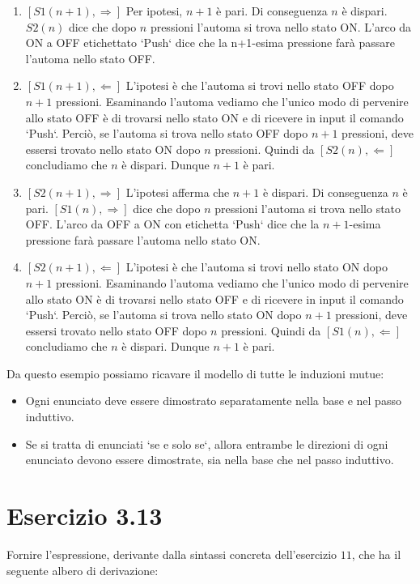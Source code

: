 		\begin{enumerate}
		  \item $[S1(n+1), \Rightarrow]$ Per ipotesi, $n+1$ è pari. Di conseguenza $n$ è
		  dispari.
		  $S2(n)$ dice che dopo $n$ pressioni l'automa si trova nello stato ON. L'arco
		  da ON a OFF etichettato `Push` dice che la n+1-esima pressione farà
		  passare l'automa nello stato OFF.
		  \item $[S1(n+1), \Leftarrow]$ L'ipotesi è che l'automa si trovi nello
		  stato OFF dopo $n+1$ pressioni. Esaminando l'automa vediamo che l'unico modo
		  di pervenire allo stato OFF è di trovarsi nello stato ON e di ricevere in
		  input il comando `Push`. Perciò, se l'automa si trova nello stato OFF dopo
		  $n+1$ pressioni, deve essersi trovato nello stato ON dopo $n$ pressioni.
		  Quindi da $[S2(n), \Leftarrow]$ concludiamo che $n$ è dispari. Dunque
		  $n+1$ è pari.
		  \item $[S2(n+1), \Rightarrow]$ L'ipotesi afferma che $n+1$ è dispari. Di conseguenza
		  $n$ è pari. $[S1(n), \Rightarrow]$ dice che dopo $n$ pressioni l'automa si trova
		  nello stato OFF. L'arco da OFF a ON con etichetta `Push` dice che la
		  $n+1$-esima pressione farà passare l'automa nello stato ON.
		  \item $[S2(n+1), \Leftarrow]$ L'ipotesi è che l'automa si trovi nello
		  stato ON dopo $n+1$ pressioni. Esaminando l'automa vediamo che l'unico modo
		  di pervenire allo stato ON è di trovarsi nello stato OFF e di ricevere in
		  input il comando `Push`. Perciò, se l'automa si trova nello stato ON dopo
		  $n+1$ pressioni, deve essersi trovato nello stato OFF dopo $n$ pressioni.
		  Quindi da $[S1(n), \Leftarrow]$ concludiamo che $n$ è dispari. Dunque
		  $n+1$ è pari.
		\end{enumerate}
		
		Da questo esempio possiamo ricavare il modello di tutte le induzioni mutue:
		
		\begin{itemize}
		  \item Ogni enunciato deve essere dimostrato separatamente nella base e nel
		  passo induttivo.
		  \item Se si tratta di enunciati `se e solo se`, allora entrambe le direzioni
		  di ogni enunciato devono essere dimostrate, sia nella base che nel passo
		  induttivo.
		\end{itemize}
		
		\newpage
		
	\section{Esercizio 3.13}
		Fornire l'espressione, derivante dalla sintassi concreta
		dell'esercizio $11$, che ha il seguente albero di derivazione:
		

